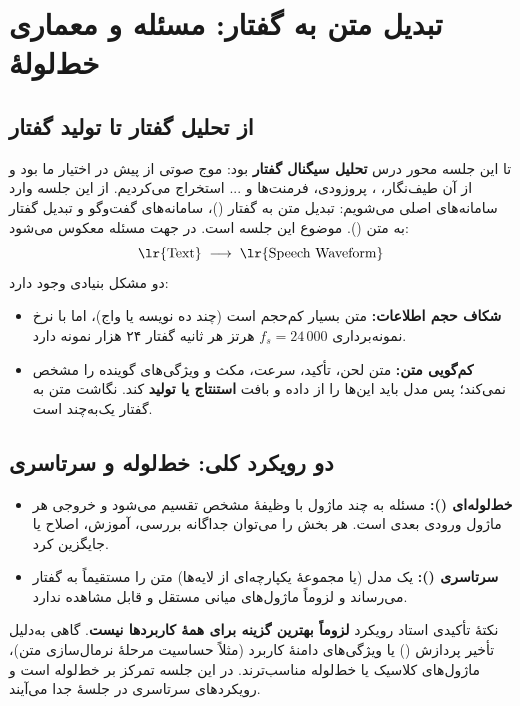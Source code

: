 \chapter{تبدیل متن به گفتار: مسئله و معماری خط‌لولهٔ }

\section{از تحلیل گفتار تا تولید گفتار}

تا این جلسه محور درس \textbf{تحلیل سیگنال گفتار} بود: موج صوتی از پیش در اختیار ما بود و از آن طیف‌نگار، ، پروزودی، فرمنت‌ها و ... استخراج می‌کردیم. از این جلسه وارد سامانه‌های اصلی می‌شویم: تبدیل متن به گفتار ()، سامانه‌های گفت‌وگو و تبدیل گفتار به متن (). موضوع این جلسه  است. در  جهت مسئله معکوس می‌شود:
\[
\text{\lr{Text}} \;\longrightarrow\; \text{\lr{Speech Waveform}}
\]
دو مشکل بنیادی وجود دارد:
\begin{itemize}
  \item \textbf{شکاف حجم اطلاعات:} متن بسیار کم‌حجم است (چند ده نویسه یا واج)، اما با نرخ نمونه‌برداری $f_s = 24\,000$ هرتز هر ثانیه گفتار ۲۴ هزار نمونه دارد.
  \item \textbf{کم‌گویی متن:} متن لحن، تأکید، سرعت، مکث و ویژگی‌های گوینده را مشخص نمی‌کند؛ پس مدل باید این‌ها را از داده و بافت \textbf{استنتاج یا تولید} کند. نگاشت متن به گفتار یک‌به‌چند است.
\end{itemize}


\section{دو رویکرد کلی: خط‌لوله و سرتاسری}

\begin{itemize}
  \item \textbf{خط‌لوله‌ای ():} مسئله به چند ماژول با وظیفهٔ مشخص تقسیم می‌شود و خروجی هر ماژول ورودی بعدی است. هر بخش را می‌توان جداگانه بررسی، آموزش، اصلاح یا جایگزین کرد.
  \item \textbf{سرتاسری ():} یک مدل (یا مجموعهٔ یکپارچه‌ای از لایه‌ها) متن را مستقیماً به گفتار می‌رساند و لزوماً ماژول‌های میانی مستقل و قابل مشاهده ندارد.
\end{itemize}

\begin{exambox}{نکتهٔ تأکیدی استاد}
رویکرد  \textbf{لزوماً بهترین گزینه برای همهٔ کاربردها نیست}. گاهی به‌دلیل تأخیر پردازش () یا ویژگی‌های دامنهٔ کاربرد (مثلاً حساسیت مرحلهٔ نرمال‌سازی متن)، ماژول‌های کلاسیک یا خط‌لوله مناسب‌ترند. در این جلسه تمرکز بر خط‌لوله است و رویکردهای سرتاسری در جلسهٔ جدا می‌آیند.
\end{exambox}

